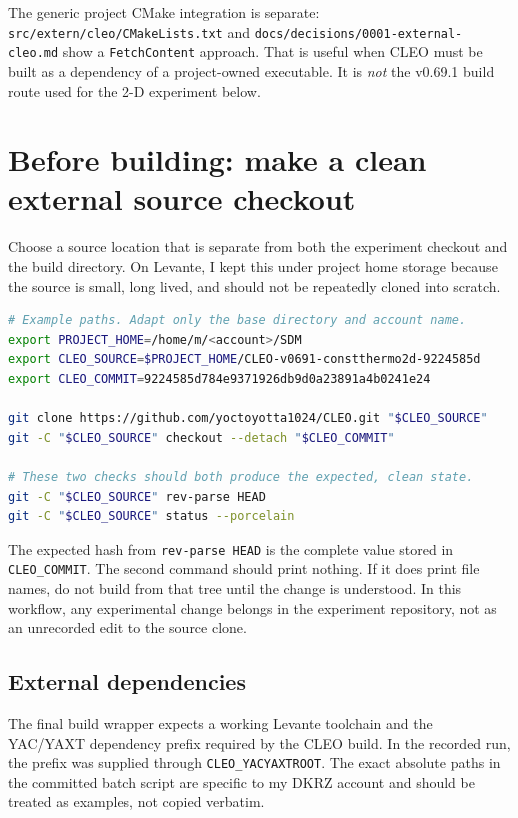 \documentclass[11pt,a4paper]{article}
\begin{document}
The generic project CMake integration is separate: \texttt{src/extern/cleo/CMakeLists.txt} and \texttt{docs/decisions/0001-external-cleo.md} show a \texttt{FetchContent} approach. That is useful when CLEO must be built as a dependency of a project-owned executable. It is \emph{not} the v0.69.1 build route used for the 2-D experiment below.

\section{Before building: make a clean external source checkout}

Choose a source location that is separate from both the experiment checkout and the build directory. On Levante, I kept this under project home storage because the source is small, long lived, and should not be repeatedly cloned into scratch.

\begin{lstlisting}[language=bash]
# Example paths. Adapt only the base directory and account name.
export PROJECT_HOME=/home/m/<account>/SDM
export CLEO_SOURCE=$PROJECT_HOME/CLEO-v0691-constthermo2d-9224585d
export CLEO_COMMIT=9224585d784e9371926db9d0a23891a4b0241e24

git clone https://github.com/yoctoyotta1024/CLEO.git "$CLEO_SOURCE"
git -C "$CLEO_SOURCE" checkout --detach "$CLEO_COMMIT"

# These two checks should both produce the expected, clean state.
git -C "$CLEO_SOURCE" rev-parse HEAD
git -C "$CLEO_SOURCE" status --porcelain
\end{lstlisting}

The expected hash from \texttt{rev-parse HEAD} is the complete value stored in \texttt{CLEO\_COMMIT}. The second command should print nothing. If it does print file names, do not build from that tree until the change is understood. In this workflow, any experimental change belongs in the experiment repository, not as an unrecorded edit to the source clone.

\subsection{External dependencies}

The final build wrapper expects a working Levante toolchain and the YAC/YAXT dependency prefix required by the CLEO build. In the recorded run, the prefix was supplied through \texttt{CLEO\_YACYAXTROOT}. The exact absolute paths in the committed batch script are specific to my DKRZ account and should be treated as examples, not copied verbatim.
\end{document}
